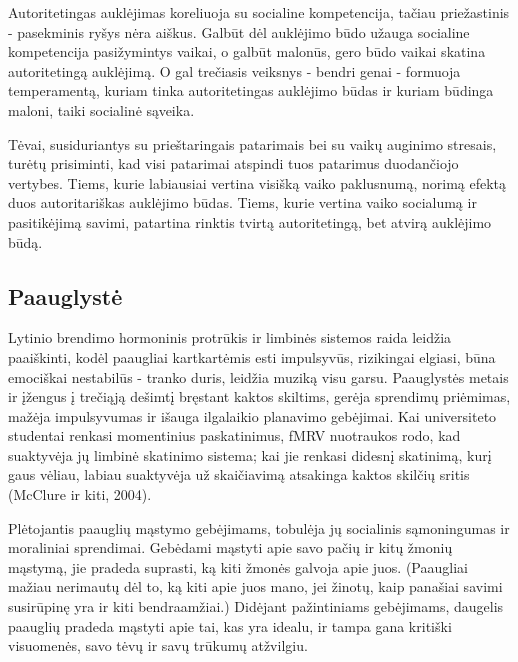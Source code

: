\documentclass{article}
\begin{document}
Autoritetingas auklėjimas koreliuoja su socialine kompetencija,
tačiau priežastinis - pasekminis ryšys nėra aiškus.
Galbūt dėl auklėjimo būdo užauga socialine kompetencija
pasižymintys vaikai, o galbūt malonūs, gero
būdo vaikai skatina autoritetingą auklėjimą. O gal
trečiasis veiksnys - bendri genai - formuoja temperamentą,
kuriam tinka autoritetingas auklėjimo būdas
ir kuriam būdinga maloni, taiki socialinė sąveika.

Tėvai, susiduriantys su prieštaringais patarimais bei su vaikų auginimo stresais,
turėtų prisiminti, kad visi patarimai atspindi tuos patarimus duodančiojo
vertybes. Tiems, kurie labiausiai vertina visišką vaiko paklusnumą, norimą efektą
duos autoritariškas auklėjimo būdas. Tiems, kurie vertina vaiko socialumą ir pasitikėjimą
savimi, patartina rinktis tvirtą autoritetingą, bet atvirą auklėjimo būdą.

\subsection{Paauglystė}
Lytinio brendimo hormoninis protrūkis ir limbinės sistemos raida leidžia paaiškinti, kodėl paaugliai
kartkartėmis esti impulsyvūs, rizikingai elgiasi, būna emociškai nestabilūs - tranko
duris, leidžia muziką visu garsu. Paauglystės metais ir įžengus į trečiąją dešimtį
bręstant kaktos skiltims, gerėja sprendimų priėmimas, mažėja impulsyvumas ir
išauga ilgalaikio planavimo gebėjimai. Kai universiteto studentai renkasi momentinius
paskatinimus, fMRV nuotraukos rodo, kad suaktyvėja jų limbinė skatinimo
sistema; kai jie renkasi didesnį skatinimą, kurį gaus vėliau, labiau suaktyvėja
už skaičiavimą atsakinga kaktos skilčių sritis (McClure ir kiti, 2004).

Plėtojantis paauglių mąstymo gebėjimams, tobulėja jų socialinis sąmoningumas
ir moraliniai sprendimai. Gebėdami mąstyti apie savo pačių ir kitų žmonių mąstymą,
jie pradeda suprasti, ką kiti žmonės galvoja apie juos. (Paaugliai mažiau
nerimautų dėl to, ką kiti apie juos mano, jei žinotų, kaip panašiai savimi susirūpinę
yra ir kiti bendraamžiai.) Didėjant pažintiniams gebėjimams, daugelis paauglių
pradeda mąstyti apie tai, kas yra idealu, ir tampa gana kritiški visuomenės,
savo tėvų ir savų trūkumų atžvilgiu.
\end{document}
